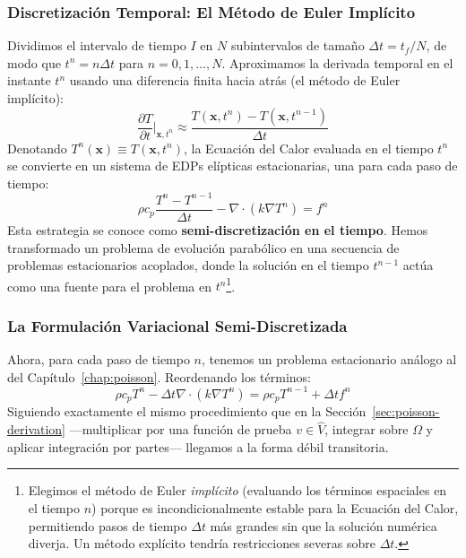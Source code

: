 \subsubsection{Discretización Temporal: El Método de Euler Implícito}
Dividimos el intervalo de tiempo \(I\) en \(N\) subintervalos de tamaño \(\Delta t = t_f / N\), de modo que \(t^n = n \Delta t\) para \(n=0, 1, \dots, N\). Aproximamos la derivada temporal en el instante \(t^n\) usando una diferencia finita hacia atrás (el método de Euler implícito):
\begin{equation}
    \frac{\partial T}{\partial t} \bigg|_{\bm{x}, t^n} \approx \frac{T(\bm{x}, t^n) - T(\bm{x}, t^{n-1})}{\Delta t}
    \label{eq:euler-backward}
\end{equation}
Denotando \(T^n(\bm{x}) \equiv T(\bm{x}, t^n)\), la Ecuación del Calor evaluada en el tiempo \(t^n\) se convierte en un sistema de EDPs elípticas estacionarias, una para cada paso de tiempo:
\[
\rho c_p \frac{T^n - T^{n-1}}{\Delta t} - \nabla \cdot (k \nabla T^n) = f^n
\]
Esta estrategia se conoce como \textbf{semi-discretización en el tiempo}. Hemos transformado un problema de evolución parabólico en una secuencia de problemas estacionarios acoplados, donde la solución en el tiempo \(t^{n-1}\) actúa como una fuente para el problema en \(t^n\)\footnote{Elegimos el método de Euler \textit{implícito} (evaluando los términos espaciales en el tiempo \(n\)) porque es incondicionalmente estable para la Ecuación del Calor, permitiendo pasos de tiempo \(\Delta t\) más grandes sin que la solución numérica diverja. Un método explícito tendría restricciones severas sobre \(\Delta t\).}.

\subsubsection{La Formulación Variacional Semi-Discretizada}
Ahora, para cada paso de tiempo \(n\), tenemos un problema estacionario análogo al del Capítulo~\ref{chap:poisson}. Reordenando los términos:
\[
\rho c_p T^n - \Delta t \nabla \cdot (k \nabla T^n) = \rho c_p T^{n-1} + \Delta t f^n
\]
Siguiendo exactamente el mismo procedimiento que en la Sección~\ref{sec:poisson-derivation} ---multiplicar por una función de prueba \(v \in \hat{V}\), integrar sobre \(\Omega\) y aplicar integración por partes--- llegamos a la forma débil transitoria.

